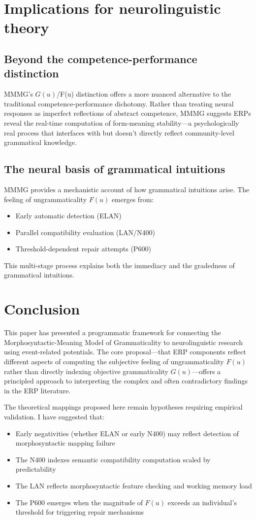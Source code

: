 \documentclass[12pt,letterpaper]{article}
\begin{document}
\section{Implications for neurolinguistic theory}
\subsection{Beyond the competence-performance distinction}
MMMG's $G(u)$/F(u) distinction offers a more nuanced alternative to the traditional competence-performance dichotomy. Rather than treating neural responses as imperfect reflections of abstract competence, MMMG suggests ERPs reveal the real-time computation of form-meaning stability---a psychologically real process that interfaces with but doesn't directly reflect community-level grammatical knowledge.

\subsection{The neural basis of grammatical intuitions}
MMMG provides a mechanistic account of how grammatical intuitions arise. The feeling of ungrammaticality $F(u)$ emerges from:

\begin{itemize}
    \item Early automatic detection (ELAN)
    \item Parallel compatibility evaluation (LAN/N400)
    \item Threshold-dependent repair attempts (P600)
\end{itemize}
This multi-stage process explains both the immediacy and the gradedness of grammatical intuitions.

\section{Conclusion}

This paper has presented a programmatic framework for connecting the Morphosyntactic-Meaning Model of Grammaticality to neurolinguistic research using event-related potentials. The core proposal—that ERP components reflect different aspects of computing the subjective feeling of ungrammaticality $F(u)$ rather than directly indexing objective grammaticality $G(u)$—offers a principled approach to interpreting the complex and often contradictory findings in the ERP literature.

The theoretical mappings proposed here remain hypotheses requiring empirical validation. I have suggested that:
\begin{itemize}
    \item Early negativities (whether ELAN or early N400) may reflect detection of morphosyntactic mapping failure
    \item The N400 indexes semantic compatibility computation scaled by predictability  
    \item The LAN reflects morphosyntactic feature checking and working memory load
    \item The P600 emerges when the magnitude of $F(u)$ exceeds an individual's threshold for triggering repair mechanisms
\end{itemize}
\end{document}
